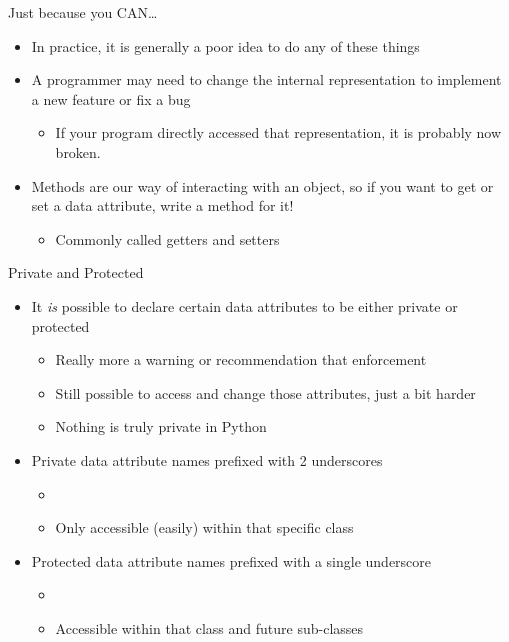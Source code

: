 \documentclass[pdf, aspectratio=169, 12pt]{beamer}
\begin{document}
\begin{frame}{Just because you CAN\ldots}
	\begin{itemize}
		\item In practice, it is generally a poor idea to do any of these things
		\item A programmer may need to change the internal representation to implement a new feature or fix a bug
			\begin{itemize}
				\item If your program directly accessed that representation, it is probably now broken.
			\end{itemize}
		\item Methods are our way of interacting with an object, so if you want to get or set a data attribute, write a method for it!
			\begin{itemize}
				\item Commonly called getters and setters
			\end{itemize}
	\end{itemize}
\end{frame}

\begin{frame}{Private and Protected}
	\begin{itemize}
		\item It \emph{is} possible to declare certain data attributes to be either private or protected
			\begin{itemize}
				\item Really more a warning or recommendation that enforcement
				\item Still possible to access and change those attributes, just a bit harder
				\item Nothing is truly private in Python
			\end{itemize}
		\item<2-> Private data attribute names prefixed with 2 underscores
			\begin{itemize}
				\item {}
				\item Only accessible (easily) within that specific class
			\end{itemize}
		\item<3-> Protected data attribute names prefixed with a single underscore
			\begin{itemize}
				\item {}
				\item Accessible within that class and future sub-classes
			\end{itemize}
	\end{itemize}
\end{frame}
\end{document}

